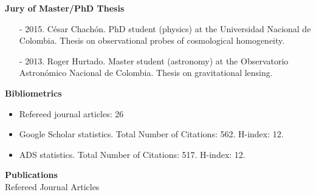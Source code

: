 \documentclass[letterpaper,11pt,onecolumn]{article}
\begin{document}
{\bf Jury of Master/PhD Thesis}
\begin{itemize}
\item[-] 2015. C\'esar Chach\'on. PhD student (physics) at the Universidad Nacional de Colombia. Thesis on observational probes of cosmological homogeneity.
\item[-] 2013. Roger Hurtado. Master student (astronomy) at the Observatorio Astron\'omico Nacional de Colombia. Thesis on gravitational lensing.
\end{itemize}

{\bf Bibliometrics}\\
\noindent 
\begin{itemize}
\item Refereed journal articles: 26
\item Google Scholar statistics. Total Number of Citations: 562. H-index: 12.
\item ADS statistics. Total Number of Citations: 517. H-index: 12.
\end{itemize}


{\bf Publications}\\

\indent
Refereed Journal Articles\\
\end{document}
